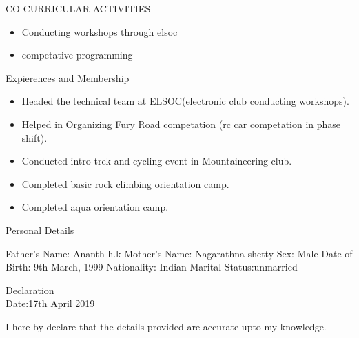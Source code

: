 \documentclass[10pt]{article}
\begin{document}
		
	\begin{minipage}[t][2cm][t]{0.2\textwidth}
		CO-CURRICULAR ACTIVITIES
		
	\end{minipage}
	\begin{minipage}[t][2cm][t]{0.8\textwidth}
		\begin{itemize}
		\item Conducting workshops through elsoc
		\item competative programming
	
	\end{itemize}
		
	\end{minipage}



		\begin{minipage}[t][2cm][t]{0.2\textwidth}
		Expierences and Membership
		
	\end{minipage}
	\begin{minipage}[t][2cm][t]{0.8\textwidth}
		\begin{itemize}
			\item Headed the technical team at ELSOC(electronic club conducting workshops).
			\item Helped in Organizing Fury Road competation (rc car competation in phase shift).
			\item Conducted intro trek and cycling event in Mountaineering club.
			\item Completed basic rock climbing orientation  camp.
			\item Completed aqua orientation camp.
			
		\end{itemize}
		
	\end{minipage}


		
	\begin{minipage}[t][3cm][t]{0.2\textwidth}
		Personal Details
		
	\end{minipage}
	\begin{minipage}[t][3cm][t]{0.8\textwidth}
		Father's Name: Ananth h.k
		\newline Mother's Name: Nagarathna shetty
		\newline Sex: Male
		\newline Date of Birth: 9th March, 1999
		\newline Nationality: Indian
		\newline Marital Status:unmarried
		
	\end{minipage}

	
		\begin{minipage}[t][2cm][t]{0.2\textwidth}
		Declaration
		\\
		Date:17th April 2019 
		
	\end{minipage}
	\begin{minipage}[t][2cm][t]{0.8\textwidth}
		I here by declare that the details provided are accurate upto my knowledge.
		
	\end{minipage}


	

	
	
\end{document}
